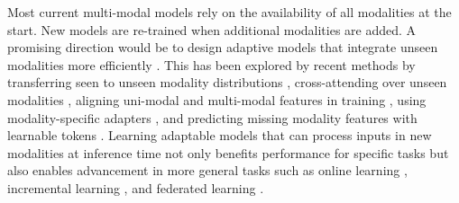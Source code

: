 Most current multi-modal models rely on the availability of all modalities at the start. New models are re-trained when additional modalities are added. A promising direction would be to design adaptive models that integrate unseen modalities more efficiently \citep{ma2022multimodal}. This has been explored by recent methods by transferring seen to unseen modality distributions \citep{wang2023distribution}, cross-attending over unseen modalities \citep{recasens2023zorro}, aligning uni-modal and multi-modal features in training \citep{zhang2023learning}, using modality-specific adapters \citep{lin2023vision}, and predicting missing modality features with learnable tokens \citep{kim2024missing}. Learning adaptable models that can process inputs in new modalities at inference time not only benefits performance for specific tasks but also enables advancement in more general tasks such as online learning \citep{bottou1998online}, incremental learning \citep{schlimmer1986case,utgoff1989incremental}, and federated learning \citep{konevcny2016federated}.








